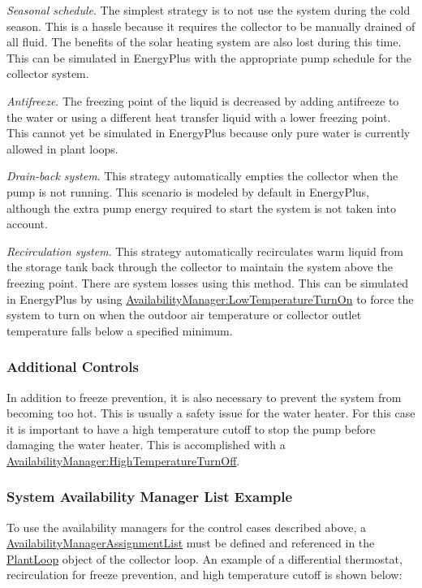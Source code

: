 \emph{Seasonal schedule}. The simplest strategy is to not use the system during the cold season. This is a hassle because it requires the collector to be manually drained of all fluid. The benefits of the solar heating system are also lost during this time. This can be simulated in EnergyPlus with the appropriate pump schedule for the collector system.

\emph{Antifreeze}. The freezing point of the liquid is decreased by adding antifreeze to the water or using a different heat transfer liquid with a lower freezing point. This cannot yet be simulated in EnergyPlus because only pure water is currently allowed in plant loops.

\emph{Drain-back system}. This strategy automatically empties the collector when the pump is not running. This scenario is modeled by default in EnergyPlus, although the extra pump energy required to start the system is not taken into account.

\emph{Recirculation system}. This strategy automatically recirculates warm liquid from the storage tank back through the collector to maintain the system above the freezing point. There are system losses using this method. This can be simulated in EnergyPlus by using \hyperref[availabilitymanagerlowtemperatureturnon]{AvailabilityManager:LowTemperatureTurnOn} to force the system to turn on when the outdoor air temperature or collector outlet temperature falls below a specified minimum.

\subsubsection{Additional Controls}\label{additional-controls}

In addition to freeze prevention, it is also necessary to prevent the system from becoming too hot. This is usually a safety issue for the water heater. For this case it is important to have a high temperature cutoff to stop the pump before damaging the water heater. This is accomplished with a \hyperref[availabilitymanagerhightemperatureturnoff]{AvailabilityManager:HighTemperatureTurnOff}.

\subsubsection{System Availability Manager List Example}\label{system-availability-manager-list-example}

To use the availability managers for the control cases described above, a \hyperref[availabilitymanagerassignmentlist]{AvailabilityManagerAssignmentList} must be defined and referenced in the \hyperref[plantloop]{PlantLoop} object of the collector loop. An example of a differential thermostat, recirculation for freeze prevention, and high temperature cutoff is shown below:


